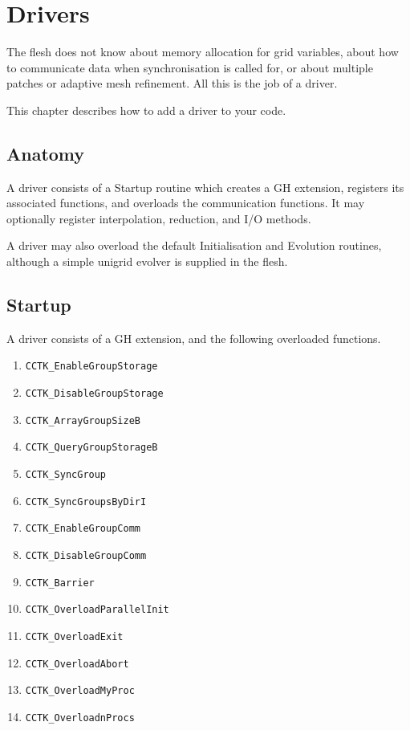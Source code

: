 \section{Drivers}

The flesh does not know about memory allocation for grid variables, about how
to communicate data when synchronisation is called for, or about
multiple patches or adaptive mesh refinement.  All this is the job of a driver.

This chapter describes how to add a driver to your code.

\subsection{Anatomy}

A driver consists of a Startup routine which creates a GH extension, 
registers its associated functions, and overloads the communication functions.
It may optionally register interpolation, reduction, and I/O methods.

A driver may also overload the default Initialisation and Evolution routines,
although a simple unigrid evolver is supplied in the flesh.

\subsection{Startup}

A driver consists of a GH extension, and the following overloaded
functions.

\begin{enumerate}
\item{} {\tt CCTK\_EnableGroupStorage}
\item{} {\tt CCTK\_DisableGroupStorage}
\item{} {\tt CCTK\_ArrayGroupSizeB}
\item{} {\tt CCTK\_QueryGroupStorageB}
\item{} {\tt CCTK\_SyncGroup}
\item{} {\tt CCTK\_SyncGroupsByDirI}
\item{} {\tt CCTK\_EnableGroupComm}
\item{} {\tt CCTK\_DisableGroupComm}
\item{} {\tt CCTK\_Barrier}
\item{} {\tt CCTK\_OverloadParallelInit}
\item{} {\tt CCTK\_OverloadExit}
\item{} {\tt CCTK\_OverloadAbort}
\item{} {\tt CCTK\_OverloadMyProc}
\item{} {\tt CCTK\_OverloadnProcs}
\end{enumerate}


